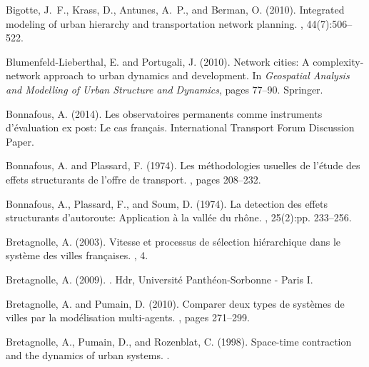 \documentclass[11pt]{article}
\begin{document}
\begin{thebibliography}{}
Bigotte, J.~F., Krass, D., Antunes, A.~P., and Berman, O. (2010).
\newblock Integrated modeling of urban hierarchy and transportation network
  planning.
,
  44(7):506--522.

Blumenfeld-Lieberthal, E. and Portugali, J. (2010).
\newblock Network cities: A complexity-network approach to urban dynamics and
  development.
\newblock In {\em Geospatial Analysis and Modelling of Urban Structure and
  Dynamics}, pages 77--90. Springer.

Bonnafous, A. (2014).
\newblock Les observatoires permanents comme instruments d'{\'e}valuation ex
  post: Le cas fran{\c{c}}ais.
\newblock International Transport Forum Discussion Paper.

Bonnafous, A. and Plassard, F. (1974).
\newblock Les m{\'e}thodologies usuelles de l'{\'e}tude des effets structurants
  de l'offre de transport.
, pages 208--232.

Bonnafous, A., Plassard, F., and Soum, D. (1974).
\newblock La detection des effets structurants d'autoroute: Application {\`a}
  la vall{\'e}e du rh{\^o}ne.
, 25(2):pp. 233--256.

Bretagnolle, A. (2003).
\newblock Vitesse et processus de s{\'e}lection hi{\'e}rarchique dans le
  syst{\`e}me des villes fran{\c{c}}aises.
, 4.

Bretagnolle, A. (2009).
.
\newblock Hdr, Universit{\'e} Panth{\'e}on-Sorbonne - Paris I.

Bretagnolle, A. and Pumain, D. (2010).
\newblock Comparer deux types de syst{\`e}mes de villes par la mod{\'e}lisation
  multi-agents.
, pages 271--299.

Bretagnolle, A., Pumain, D., and Rozenblat, C. (1998).
\newblock Space-time contraction and the dynamics of urban systems.
.


\end{thebibliography}
\end{document}

